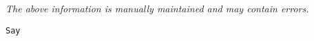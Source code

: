 \label{pkg:say}

{\tiny \it The above information is manually maintained and may contain errors.}
\begin{verbatim}
Say
\end{verbatim}
